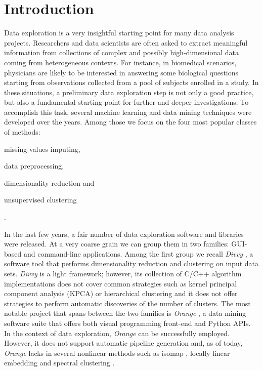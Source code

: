 \documentclass[twoside,11pt]{article}
\makeatletter
\newcommand{\py}{{Python}\@\xspace}
\makeatother
\begin{document}
\section{Introduction}\label{sec:intro}
Data exploration is a very insightful starting point for many data analysis projects. Researchers and data scientists are often asked to extract meaningful information from collections of complex and possibly high-dimensional data coming from heterogeneous contexts.
For instance, in biomedical scenarios, physicians are likely to be interested in answering some biological questions starting from observations collected from a pool of subjects enrolled in a study.
In these situations, a preliminary data exploration step is not only a good practice, but also a fundamental starting point for further and deeper investigations.
To accomplish this task, several machine learning and data mining techniques were developed over the years.
Among those we focus on the four most popular classes of methods: \begin{enumerate*}[label=(\roman*)]
  \item missing values imputing,
  \item data preprocessing,
  \item dimensionality reduction and
  \item unsupervised clustering
\end{enumerate*}.

In the last few years, a fair number of data exploration software and libraries were released. At a very coarse grain we can group them in two families: GUI-based and command-line applications.
Among the first group we recall \emph{Divvy} \citep{lewis2013divvy}, a software tool that performs dimensionality reduction and clustering on input data sets. \emph{Divvy} is a light framework; however,
its collection of {C/C++} algorithm implementations does not cover common strategies such as kernel principal component analysis (KPCA) \citep{scholkopf1997kernel} or hierarchical clustering \citep{friedman2001elements} and it does not offer strategies to perform automatic discoveries of the number of clusters.
The most notable project that spans between the two families is \emph{Orange} \citep{demvsar2013orange}, a data mining software suite that offers both visual programming front-end and \py APIs. In the context of data exploration, \emph{Orange} can be successfully employed. However, it does not support automatic pipeline generation
and, as of today, \emph{Orange} lacks in several nonlinear methods such as isomap \citep{tenenbaum2000global}, locally linear embedding \citep{roweis2000nonlinear} and spectral clustering \citep{shi2000normalized}.
\end{document}
